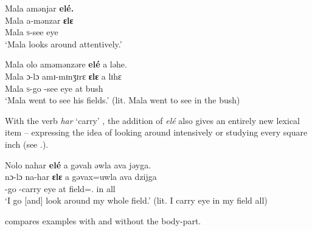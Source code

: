 \ea \label{ex:9:52}
Mala  amənjar  \textbf{elé.}\\
\gll  Mala   a-mənzar   \textbf{ɛlɛ}\\
      Mala   \textsc{s}-see    eye\\
\glt  ‘Mala looks around attentively.’ 
\z

\ea \label{ex:9:53}
Mala  olo  aməmənzəre  \textbf{elé}  a  ləhe.\\
\gll  Mala  ɔ{}-lɔ  amɪ-mɪnʒɪrɛ  \textbf{ɛlɛ}  a  lɪhɛ\\
      Mala  \textsc{s}-go  {\DEP}-see    eye  at  bush\\
\glt  ‘Mala went to see his fields.’ (lit. Mala went to see in the bush)
\z

With the verb \textit{har} ‘carry’ , the addition of \textit{elé} also gives an entirely new lexical item -- expressing the idea of looking around intensively or studying every square inch (see .). 

\ea \label{ex:9:54}
Nolo  nahar  \textbf{elé}  a  gəvah  əwla  ava  jəyga.\\
\gll  nɔ-lɔ  na-har     \textbf{ɛlɛ}   a   gəvax=uwla    ava  dzijga\\
      {\oneS}-go  {\oneS}-carry    eye  at  field={\oneS}.{\POSS}  in  all\\
\glt  ‘I go [and] look around my whole field.’ (lit. I carry eye in my field  all)
\z

 compares examples with and without the body-part.

\begin{table}
\caption{Selected verbs with and without the incorporation of elé ‘eye’\label{tab:76}}
\end{table}

